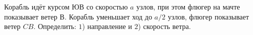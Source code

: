 Корабль идёт курсом ЮВ со скоростью $a$ узлов, при этом флюгер на
мачте показывает ветер $В$. Корабль уменьшает ход до $a/2$ узлов, флюгер
показывает ветер $CB$. Определить: $1$) направление и $2$) скорость
ветра.
